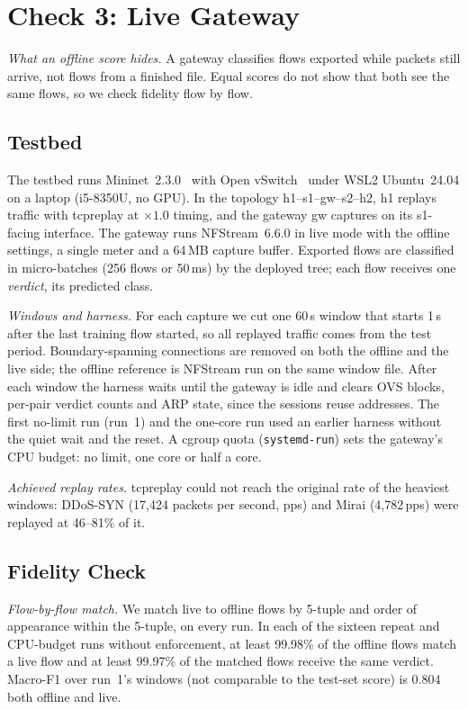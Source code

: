 \section{Check 3: Live Gateway}\label{sec:live}

\emph{What an offline score hides.} A gateway classifies flows exported while packets still arrive, not flows from a finished file. Equal scores do not show that both see the same flows, so we check fidelity flow by flow.

\subsection{Testbed}\label{sec:testbed}

The testbed runs Mininet~2.3.0~\cite{lantz2010mininet} with Open vSwitch~\cite{pfaff2015ovs} under WSL2 Ubuntu~24.04 on a laptop (i5-8350U, no GPU). In the topology h1--s1--gw--s2--h2, h1 replays traffic with tcpreplay at $\times1.0$ timing, and the gateway gw captures on its s1-facing interface. The gateway runs NFStream~6.6.0 in live mode with the offline settings, a single meter and a 64\,MB capture buffer. Exported flows are classified in micro-batches (256 flows or 50\,ms) by the deployed tree; each flow receives one \emph{verdict}, its predicted class.

\emph{Windows and harness.} For each capture we cut one 60\,s window that starts 1\,s after the last training flow started, so all replayed traffic comes from the test period. Boundary-spanning connections are removed on both the offline and the live side; the offline reference is NFStream run on the same window file. After each window the harness waits until the gateway is idle and clears OVS blocks, per-pair verdict counts and ARP state, since the sessions reuse addresses. The first no-limit run (run~1) and the one-core run used an earlier harness without the quiet wait and the reset. A cgroup quota (\texttt{systemd-run}) sets the gateway's CPU budget: no limit, one core or half a core.

\emph{Achieved replay rates.} tcpreplay could not reach the original rate of the heaviest windows: DDoS-SYN (17,424 packets per second, pps) and Mirai (4,782\,pps) were replayed at 46--81\% of it.

\subsection{Fidelity Check}\label{sec:fidelity}

\emph{Flow-by-flow match.} We match live to offline flows by 5-tuple and order of appearance within the 5-tuple, on every run. In each of the sixteen repeat and CPU-budget runs without enforcement, at least 99.98\% of the offline flows match a live flow and at least 99.97\% of the matched flows receive the same verdict. Macro-F1 over run~1's windows (not comparable to the test-set score) is 0.804 both offline and live.

